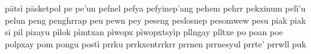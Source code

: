 \documentclass[a4paper]{article}
\begin{document}
pätsì\hspace{2mm}
päsketpol\hspace{2mm}
pe\hspace{2mm}
pe'un\hspace{2mm}
pefnel\hspace{2mm}
pefya\hspace{2mm}
pefyinep'ang\hspace{2mm}
pehem\hspace{2mm}
pehrr\hspace{2mm}
pekxinum\hspace{2mm}
pelì'u\hspace{2mm}
pelun\hspace{2mm}
peng\hspace{2mm}
penghrrap\hspace{2mm}
peu\hspace{2mm}
pewn\hspace{2mm}
pey\hspace{2mm}
peseng\hspace{2mm}
peslosnep\hspace{2mm}
pesomwew\hspace{2mm}
pesu\hspace{2mm}
piak\hspace{2mm}
piak si\hspace{2mm}
pil\hspace{2mm}
pizayu\hspace{2mm}
pìlok\hspace{2mm}
pìmtxan\hspace{2mm}
pìwopx\hspace{2mm}
pìwopxtsyìp\hspace{2mm}
pllngay\hspace{2mm}
plltxe\hspace{2mm}
po\hspace{2mm}
poan\hspace{2mm}
poe\hspace{2mm}
polpxay\hspace{2mm}
pom\hspace{2mm}
pongu\hspace{2mm}
postì\hspace{2mm}
prrku\hspace{2mm}
prrkxentrrkrr\hspace{2mm}
prrnen\hspace{2mm}
prrnesyul\hspace{2mm}
prrte'\hspace{2mm}
prrwll\hspace{2mm}
puk\hspace{2mm}
\end{document}
